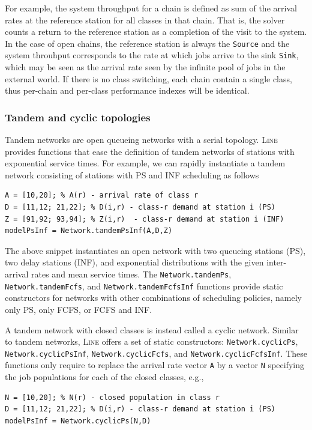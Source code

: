 For example, the system throughput for a chain is defined as sum of the arrival rates at the reference station for all classes in that chain. That is, the solver counts a return to the reference station as a completion of the visit to the system. In the case of open chains, the reference station is always the \texttt{Source} and the system throuhput corresponds to the rate at which jobs arrive to the sink \texttt{Sink}, which may be seen as the arrival rate seen by the infinite pool of jobs in the external world. If there is no class switching, each chain contain a single class, thus per-chain and per-class performance indexes will be identical.


\subsubsection{Tandem and cyclic topologies}
Tandem networks are open queueing networks with a serial topology. \textsc{Line} provides functions that ease the definition of tandem networks of stations with exponential service times. For example, we can rapidly instantiate a tandem network consisting of stations with PS and INF scheduling as follows
\begin{lstlisting}
A = [10,20]; % A(r) - arrival rate of class r
D = [11,12; 21,22]; % D(i,r) - class-r demand at station i (PS)
Z = [91,92; 93,94]; % Z(i,r)  - class-r demand at station i (INF)
modelPsInf = Network.tandemPsInf(A,D,Z)
\end{lstlisting}
The above snippet instantiates an open network with two queueing stations (PS), two delay stations (INF), and exponential distributions with the given inter-arrival rates and mean service times. The \texttt{Network.tandemPs}, \texttt{Network.tandemFcfs}, and \texttt{Network.tandemFcfsInf} functions provide static constructors for networks with other combinations of scheduling policies, namely only PS, only FCFS, or FCFS and INF.

A tandem network with closed classes is instead called a cyclic network. Similar to tandem networks, \textsc{Line} offers a set of static constructors: \texttt{Network.cyclicPs}, \texttt{Network.cyclicPsInf}, \texttt{Network.cyclicFcfs}, and \texttt{Network.cyclicFcfsInf}. These functions only require to replace the arrival rate vector \texttt{A} by a vector \texttt{N} specifying the job populations for each of the closed classes, e.g.,
\begin{lstlisting}
N = [10,20]; % N(r) - closed population in class r
D = [11,12; 21,22]; % D(i,r) - class-r demand at station i (PS)
modelPsInf = Network.cyclicPs(N,D)
\end{lstlisting}

